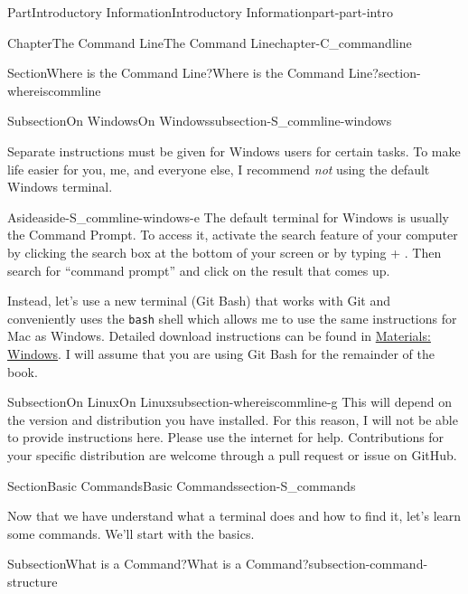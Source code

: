 \documentclass[oneside,10pt,]{book}
\newcommand{\mono}[1]{\texttt{#1}}
\newcommand{\kbd}[1]{\keys{{#1}}}
\begin{document}
\begin{partptx}{Part}{Introductory Information}{}{Introductory Information}{}{}{part-part-intro}
\begin{chapterptx}{Chapter}{The Command Line}{}{The Command Line}{}{}{chapter-C_commandline}
\begin{sectionptx}{Section}{Where is the Command Line?}{}{Where is the Command Line?}{}{}{section-whereiscommline}
\begin{subsectionptx}{Subsection}{On Windows}{}{On Windows}{}{}{subsection-S_commline-windows}
\par
Separate instructions must be given for Windows users for certain tasks. To make life easier for you, me, and everyone else, I recommend \emph{not} using the default Windows terminal.%
\begin{aside}{Aside}{}{aside-S_commline-windows-e}%
The default terminal for Windows is usually the Command Prompt. To access it, activate the search feature of your computer by clicking the search box at the bottom of your screen or by typing \kbd{Windows} + \kbd{S}. Then search for ``command prompt'' and click on the result that comes up.%
\end{aside}
Instead, let's use a new terminal (Git Bash) that works with Git and conveniently uses the \mono{bash} shell which allows me to use the same instructions for Mac as Windows. Detailed download instructions can be found in \hyperref[preface-materials-windows]{Materials: Windows}. I will assume that you are using Git Bash for the remainder of the book.%
\end{subsectionptx}
%
%
\typeout{************************************************}
\typeout{************************************************}
%
\begin{subsectionptx}{Subsection}{On Linux}{}{On Linux}{}{}{subsection-whereiscommline-g}
%
This will depend on the version and distribution you have installed. For this reason, I will not be able to provide instructions here. Please use the internet for help. Contributions for your specific distribution are welcome through a pull request or issue on GitHub.%
\end{subsectionptx}
\end{sectionptx}
%
%
\typeout{************************************************}
\typeout{************************************************}
%
\begin{sectionptx}{Section}{Basic Commands}{}{Basic Commands}{}{}{section-S_commands}
%
%
%
\begin{introduction}{}%
Now that we have understand what a terminal does and how to find it, let's learn some commands. We'll start with the basics.%
\end{introduction}%
%
%
\typeout{************************************************}
\typeout{************************************************}
%
\begin{subsectionptx}{Subsection}{What is a Command?}{}{What is a Command?}{}{}{subsection-command-structure}

\end{subsectionptx}
\end{sectionptx}
\end{chapterptx}
\end{partptx}
\end{document}
